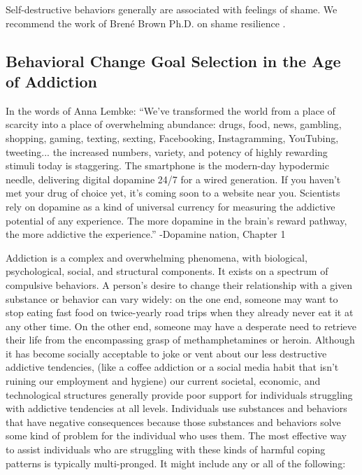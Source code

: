 \documentclass[12pt,letterpaper]{book}
\begin{document}
Self-destructive behaviors generally are associated with feelings of shame. We recommend the work of Brené Brown Ph.D. on shame resilience \cite{brownThought}.

\subsection*{Behavioral Change Goal Selection in the Age of Addiction}

In the words of Anna Lembke: “We've transformed the world from a place of scarcity into a place of overwhelming abundance: drugs, food, news, gambling, shopping, gaming, texting, sexting, Facebooking, Instagramming, YouTubing, tweeting... the increased numbers, variety, and potency of highly rewarding stimuli today is staggering. The smartphone is the modern-day hypodermic needle, delivering digital dopamine 24/7 for a wired generation. If you haven't met your drug of choice yet, it's coming soon to a website near you. Scientists rely on dopamine as a kind of universal currency for measuring the addictive potential of any experience. The more dopamine in the brain's reward pathway, the more addictive the experience.” -Dopamine nation, Chapter 1

Addiction is a complex and overwhelming phenomena, with biological, psychological, social, and structural components. It exists on a spectrum of compulsive behaviors. A person's desire to change their relationship with a given substance or behavior can vary widely: on the one end, someone may want to stop eating fast food on twice-yearly road trips when they already never eat it at any other time. On the other end, someone may have a desperate need to retrieve their life from the encompassing grasp of methamphetamines or heroin. Although it has become socially acceptable to joke or vent about our less destructive addictive tendencies, (like a coffee addiction or a social media habit that isn't ruining our employment and hygiene) our current societal, economic, and technological structures generally provide poor support for individuals struggling with addictive tendencies at all levels. Individuals use substances and behaviors that have negative consequences because those substances and behaviors solve some kind of problem for the individual who uses them. The most effective way to assist individuals who are struggling with these kinds of harmful coping patterns is typically multi-pronged. It might include any or all of the following:
\end{document}
